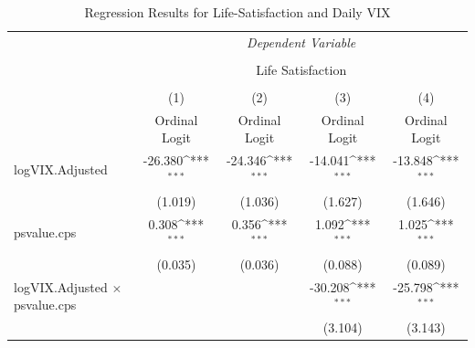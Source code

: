 \documentclass[11pt,a4paper,oldfontcommands]{memoir}
\begin{document}
{\begin{footnotesize}
\def\sym#1{\ifmmode^{#1}\else\(^{#1}\)\fi}
\begin{longtable}{l*{4}{c}}
\caption{Regression Results for Life-Satisfaction and Daily VIX \label{tab:mdl1rslt}} \\
\hline\hline
& \multicolumn{4}{c}{ \textit{Dependent Variable}} \\
\cline{2-5}\\[-4ex]
& \multicolumn{4}{c}{Life Satisfaction}\\
\\[-4ex]
                    &\multicolumn{1}{c}{(1)}&\multicolumn{1}{c}{(2)}&\multicolumn{1}{c}{(3)}&\multicolumn{1}{c}{(4)}\\
                    &\multicolumn{1}{c}{Ordinal Logit}&\multicolumn{1}{c}{Ordinal Logit}&\multicolumn{1}{c}{Ordinal Logit}&\multicolumn{1}{c}{Ordinal Logit}\\
\hline
logVIX.Adjusted     &      -26.380\sym{***}&      -24.346\sym{***}&      -14.041\sym{***}&      -13.848\sym{***}\\
                    &     (1.019)         &     (1.036)         &     (1.627)         &     (1.646)         \\
 
psvalue.cps         &       0.308\sym{***}&       0.356\sym{***}&       1.092\sym{***}&       1.025\sym{***}\\
                    &     (0.035)         &     (0.036)         &     (0.088)         &     (0.089)         \\
logVIX.Adjusted $\times$ psvalue.cps&                     &                     &     -30.208\sym{***}&     -25.798\sym{***}\\
                    &                     &                     &     (3.104)         &     (3.143)         \\
                    

\end{longtable}
\end{footnotesize}}
\end{document}

